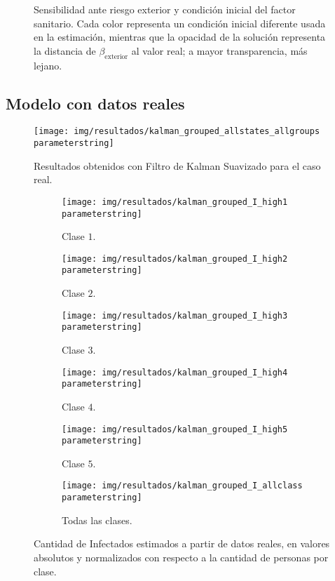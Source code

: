 \begin{figure}
\caption[Sensibilidad ante riesgo exterior y condición inicial del factor sanitario.]{Sensibilidad ante riesgo exterior y condición inicial del factor sanitario. Cada color representa un condición inicial diferente usada en la estimación, mientras que la opacidad de la solución representa la distancia de \(\beta_{\text{exterior}}\) al valor real; a mayor transparencia, más lejano.} \label{fig:legend-sensi-b}
\end{figure}


\subsection{Modelo con datos reales}


\begin{figure}[h]
\centering
\texttt{[image: img/resultados/kalman\_grouped\_allstates\_allgroups\\parameterstring]}
\caption{Resultados obtenidos con Filtro de Kalman Suavizado para el caso real.}
\label{all-nohigh}
\end{figure}



\begin{figure}
     \centering
     \begin{subfigure}[b]{0.47\textwidth}
         \centering
         \texttt{[image: img/resultados/kalman\_grouped\_I\_high1\\parameterstring]}
         \caption{Clase \(1\).}
     \end{subfigure}
     \hfill
     \begin{subfigure}[b]{.47\textwidth}
         \centering
         \texttt{[image: img/resultados/kalman\_grouped\_I\_high2\\parameterstring]}
         \caption{Clase \(2\).}
     \end{subfigure}
     \hfill
     \begin{subfigure}[b]{.47\textwidth}
         \centering
         \texttt{[image: img/resultados/kalman\_grouped\_I\_high3\\parameterstring]}
         \caption{Clase \(3\).}
     \end{subfigure}
     \hfill
     \begin{subfigure}[b]{.47\textwidth}
         \centering
         \texttt{[image: img/resultados/kalman\_grouped\_I\_high4\\parameterstring]}
         \caption{Clase \(4\).}
     \end{subfigure}
     \hfill
     \begin{subfigure}[b]{.47\textwidth}
         \centering
         \texttt{[image: img/resultados/kalman\_grouped\_I\_high5\\parameterstring]}
         \caption{Clase \(5\).}
     \end{subfigure}
     \hfill
     \begin{subfigure}[b]{.47\textwidth}
         \centering
         \texttt{[image: img/resultados/kalman\_grouped\_I\_allclass\\parameterstring]}
         \caption{Todas las clases.}
     \end{subfigure}
        \caption{Cantidad de Infectados estimados a partir de datos reales, en valores absolutos y normalizados con respecto a la cantidad de personas por clase.}
        \label{e-comp-high}
\end{figure}



